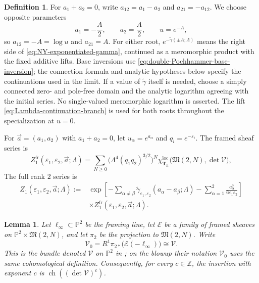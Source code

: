\documentclass{amsart}
\newtheorem{lemma}{Lemma}
\theoremstyle{definition}
\newtheorem{definition}{Definition}
\numberwithin{equation}{section}
\newcommand{\Z}{\mathbb Z}
\newcommand{\cV}{\mathcal V}
\newcommand{\ch}{\operatorname{ch}}
\newcommand{\M}{\mathfrak M}
\newcommand{\eps}{\varepsilon}
\begin{document}
\begin{definition}
\label{def:negative-root-continuation}
For \(a_1+a_2=0\), write \(a_{12}=a_1-a_2\) and \(a_{21}=-a_{12}\).  We choose opposite parameters
\[
 a_1=-\frac A2,\qquad a_2=\frac A2,\qquad u=e^{-A},
\]
so \(a_{12}=-A=\log u\) and \(a_{21}=A\).  For either root, \(e^{-\widetilde\gamma(\pm A;\Lambda)}\) means the right side of \eqref{eq:NY-exponentiated-gamma}, continued as a meromorphic product with the fixed additive lifts.  Base inversions use \eqref{eq:double-Pochhammer-base-inversion}; the connection formula and analytic hypotheses below specify the continuations used in the limit.  If a value of \(\widetilde\gamma\) itself is needed, choose a simply connected zero- and pole-free domain and the analytic logarithm agreeing with the initial series.  No single-valued meromorphic logarithm is asserted.  The lift \eqref{eq:Lambda-continuation-branch} is used for both roots throughout the specialization at \(u=0\).
\end{definition}

For \(\vec a=(a_1,a_2)\) with \(a_1+a_2=0\), let \(u_\alpha=e^{a_\alpha}\) and \(q_i=e^{-\eps_i}\).  The framed sheaf series is
\begin{equation}
 Z_1^{\mathrm{fr}}(\eps_1,\eps_2,\vec a;\Lambda)
 =\sum_{N\geq0}
 \bigl(\Lambda^4(q_1q_2)^{3/2}\bigr)^N
 \chi_{\mathbf T_{\mathrm{fr}}}^{\mathrm{loc}}
 \bigl(\M(2,N),\det\cV\bigr),
\label{eq:NY-ADHM-series}
\end{equation}
The full rank \(2\) series is
\begin{equation}
\begin{aligned}
 Z_1(\eps_1,\eps_2,\vec a;\Lambda)
 :={}&
 \exp\left[
 -\sum_{\alpha\ne\beta}
 \widetilde\gamma_{\eps_1,\eps_2}
 (a_\alpha-a_\beta;\Lambda)
 -\sum_{\alpha=1}^2
 \frac{a_\alpha^3}{6\eps_1\eps_2}\right]\\
 &\times Z_1^{\mathrm{fr}}
 (\eps_1,\eps_2,\vec a;\Lambda).
\end{aligned}
\label{eq:NY-full-partition}
\end{equation}

\begin{lemma}
\label{lem:NY-determinant-is-ADHM}
Let \(\ell_\infty\subset\mathbb P^2\) be the framing line, let \(\mathcal E\) be a family of framed sheaves on \(\mathbb P^2\times\M(2,N)\), and let \(\pi_2\) be the projection to \(\M(2,N)\).  Write
\begin{equation}
 \mathcal V_0
 =R^1\pi_{2*}\bigl(\mathcal E(-\ell_\infty)\bigr)
 \cong\cV.
\label{eq:NY-V0}
\end{equation}
This is the bundle denoted \(\mathcal V\) on \(\mathbb P^2\) in \cite{NakajimaYoshiokaPerverse}; on the blowup their notation \(\mathcal V_0\) uses the same cohomological definition.  Consequently, for every \(c\in\Z\), the insertion with exponent \(c\) is \(\ch((\det\cV)^c)\).
\end{lemma}
\end{document}
